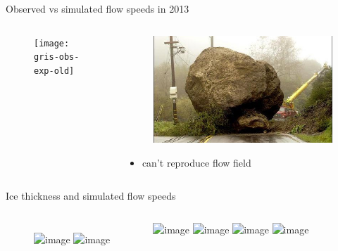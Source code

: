 \documentclass[hide notes,intlimits]{beamer}
\begin{document}
\begin{frame}{Observed vs simulated flow speeds in 2013}
  \begin{columns}[c]
    \begin{column}{.65\linewidth}
    \begin{figure}
      \texttt{[image: gris-obs-exp-old]}
    \end{figure}
    \end{column}
    \begin{column}{.35\linewidth}
      \begin{figure}
        \includegraphics[width=\textwidth]{roadblocks}
      \end{figure}
      \begin{itemize}
      \item can't reproduce flow field
      \end{itemize}
    \end{column}
  \end{columns}
\end{frame}


\begin{frame}{Ice thickness and simulated flow speeds}
\vspace{-0.74em}
  \begin{columns}
    \column[c]{5cm}
    \begin{figure}
      \includegraphics<1-2>[width=\textwidth]{greenland-obs-basal-overview}
      \includegraphics<3-4>[width=\textwidth]{greenland-obs-basal-overview-mo14}
    \end{figure}
    \column[c]{5cm}
    \includegraphics<1>[width=\textwidth]{jakobshavn-bed-5000m-ba01}
    \includegraphics<2>[width=\textwidth]{jakobshavn-speed-exp-4500m-ba01}
    \includegraphics<3>[width=\textwidth]{jakobshavn-bed-mo14}
    \includegraphics<4>[width=\textwidth]{jakobshavn-speed-exp-600-v1.2-no-scale-no-gate}
  \end{columns}
\end{frame}
\end{document}
